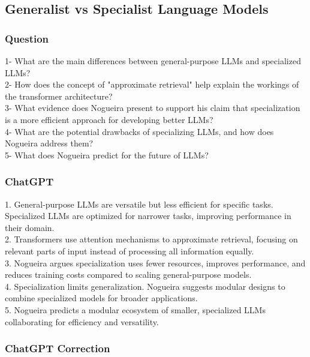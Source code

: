 \subsection{Generalist vs Specialist Language Models}
\subsubsection{Question}
\begin{tcolorbox}[breakable]
    1- What are the main differences between general-purpose LLMs and specialized LLMs?\\
2- How does the concept of "approximate retrieval" help explain the workings of the transformer architecture?\\
3- What evidence does Nogueira present to support his claim that specialization is a more efficient approach for developing better LLMs?\\
4- What are the potential drawbacks of specializing LLMs, and how does Nogueira address them?\\
5- What does Nogueira predict for the future of LLMs?\\

\end{tcolorbox}
\subsubsection{ChatGPT}
\begin{tcolorbox}[breakable]
    1. General-purpose LLMs are versatile but less efficient for specific tasks. Specialized LLMs are optimized for narrower tasks, improving performance in their domain.\\
2. Transformers use attention mechanisms to approximate retrieval, focusing on relevant parts of input instead of processing all information equally.\\
3. Nogueira argues specialization uses fewer resources, improves performance, and reduces training costs compared to scaling general-purpose models.\\
4. Specialization limits generalization. Nogueira suggests modular designs to combine specialized models for broader applications.\\
5. Nogueira predicts a modular ecosystem of smaller, specialized LLMs collaborating for efficiency and versatility.

\end{tcolorbox}
\subsubsection{ChatGPT Correction}
\begin{tcolorbox}[breakable]
    
\end{tcolorbox}
